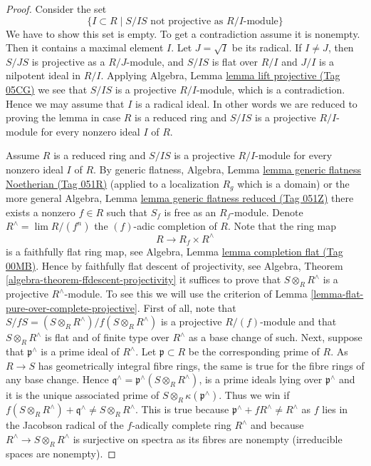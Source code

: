 \documentclass{amsart}
\theoremstyle{plain}
\theoremstyle{definition}
\theoremstyle{remark}
\numberwithin{equation}{subsection}
\def\lim{\mathop{\mathrm{lim}}\nolimits}
\begin{document}
\begin{proof}
Consider the set
$$
\{I \subset R \mid S/IS\text{ not projective as }R/I\text{-module}\}
$$
We have to show this set is empty. To get a contradiction assume it is
nonempty. Then it contains a maximal element $I$.
Let $J = \sqrt{I}$ be its radical. If $I \not = J$, then
$S/JS$ is projective as a $R/J$-module, and $S/IS$ is flat over $R/I$
and $J/I$ is a nilpotent ideal in $R/I$. Applying
Algebra, Lemma \href{https://stacks.math.columbia.edu/tag/05CG}{lemma lift projective (Tag 05CG)}
we see that $S/IS$ is a projective $R/I$-module, which is a contradiction.
Hence we may assume that $I$ is a radical ideal. In other words we
are reduced to proving the lemma in case $R$ is a reduced ring and
$S/IS$ is a projective $R/I$-module for every nonzero ideal $I$
of $R$.

\medskip\noindent
Assume $R$ is a reduced ring and $S/IS$ is a projective $R/I$-module
for every nonzero ideal $I$ of $R$. By generic flatness,
Algebra, Lemma \href{https://stacks.math.columbia.edu/tag/051R}{lemma generic flatness Noetherian (Tag 051R)}
(applied to a localization $R_g$ which is a domain) or the more general
Algebra, Lemma \href{https://stacks.math.columbia.edu/tag/051Z}{lemma generic flatness reduced (Tag 051Z)}
there exists a nonzero $f \in R$ such that $S_f$ is free as an
$R_f$-module. Denote $R^\wedge = \lim R/(f^n)$ the $(f)$-adic completion
of $R$. Note that the ring map
$$
R \longrightarrow R_f \times R^\wedge
$$
is a faithfully flat ring map, see
Algebra, Lemma \href{https://stacks.math.columbia.edu/tag/00MB}{lemma completion flat (Tag 00MB)}.
Hence by faithfully flat descent of projectivity, see
Algebra, Theorem \ref{algebra-theorem-ffdescent-projectivity}
it suffices to prove that $S \otimes_R R^\wedge$ is a projective
$R^\wedge$-module. To see this we will use the criterion of
Lemma \ref{lemma-flat-pure-over-complete-projective}.
First of all, note that $S/fS = (S \otimes_R R^\wedge)/f(S \otimes_R R^\wedge)$
is a projective $R/(f)$-module and that $S \otimes_R R^\wedge$ is flat
and of finite type over $R^\wedge$ as a base change of such.
Next, suppose that $\mathfrak p^\wedge$ is a prime ideal
of $R^\wedge$. Let $\mathfrak p \subset R$ be the corresponding prime
of $R$. As $R \to S$ has geometrically integral fibre rings, the
same is true for the fibre rings of any base change. Hence
$\mathfrak q^\wedge = \mathfrak p^\wedge(S \otimes_R R^\wedge)$,
is a prime ideals lying over $\mathfrak p^\wedge$
and it is the unique associated prime of
$S \otimes_R \kappa(\mathfrak p^\wedge)$. Thus we win if
$f(S \otimes_R R^\wedge) + \mathfrak q^\wedge \not = S \otimes_R R^\wedge$.
This is true because $\mathfrak p^\wedge + fR^\wedge \not = R^\wedge$ as
$f$ lies in the Jacobson radical of the $f$-adically complete ring $R^\wedge$
and because $R^\wedge \to S \otimes_R R^\wedge$ is surjective on spectra
as its fibres are nonempty (irreducible spaces are nonempty).
\end{proof}
\end{document}
